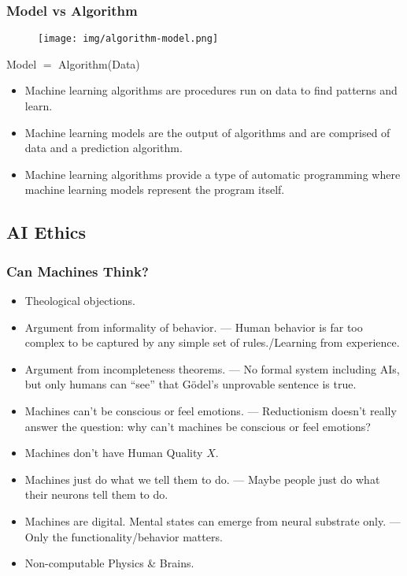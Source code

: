 \documentclass[UTF8,11pt,colorlinks,compress,openany]{beamer}%
\begin{document}
\begin{frame}\frametitle{Model vs Algorithm}
\begin{figure}[H]
\texttt{[image: img/algorithm-model.png]}
\end{figure}
\centerline{Model $=$ Algorithm(Data)}
\begin{itemize}
	\item Machine learning algorithms are procedures run on data to find patterns and learn.
	\item Machine learning models are the output of algorithms and are comprised of data and a prediction algorithm.
	\item Machine learning algorithms provide a type of automatic programming where machine learning models represent the program itself.
\end{itemize}
\end{frame}

\subsection{AI Ethics}

\begin{frame}\frametitle{Can Machines Think?}
\begin{itemize}
	\item Theological objections.
	\item Argument from informality of behavior. --- Human behavior is far too complex to be captured by any simple set of rules./Learning from experience.
	\item Argument from incompleteness theorems. --- No formal system including AIs, but only humans can ``see'' that G\"odel's unprovable sentence is true.
	\item Machines can't be conscious or feel emotions. --- Reductionism doesn't really answer the question: why can't machines be conscious or feel emotions?
	\item Machines don't have Human Quality $X$.
	\item Machines just do what we tell them to do. --- Maybe people just do what their neurons tell them to do.
	\item Machines are digital. Mental states can emerge from neural substrate only. --- Only the functionality/behavior matters.
	\item Non-computable Physics \& Brains.
\end{itemize}
\end{frame}
\end{document}
